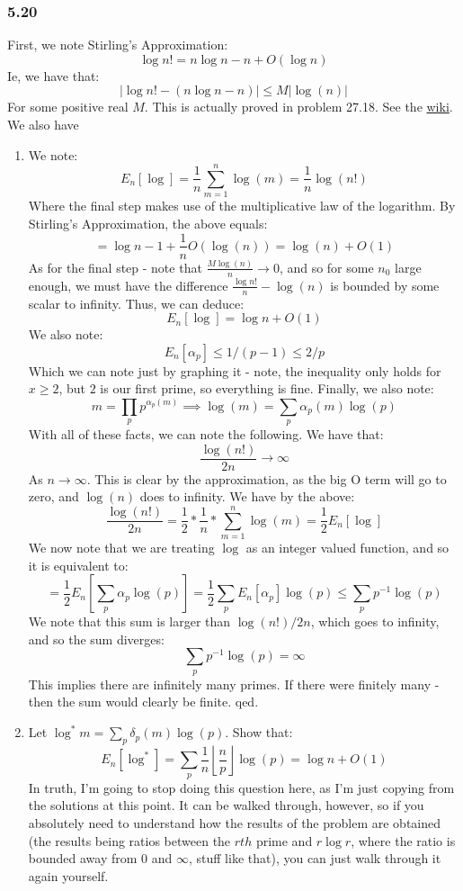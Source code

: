 \documentclass[12pt,a4paper]{article}
\newcommand{\1}[1]{\mathbbm{1}\left\{ #1 \right\}}
\newcommand{\floor}[1]{\left\lfloor #1 \right\rfloor}
\begin{document}
\subsubsection{5.20} First, we note Stirling's Approximation:
$$
	\log n! = n \log n - n + O(\log n)
$$
Ie, we have that:
$$
	\left|\log n! - (n \log n - n)\right| \leq M \left|\log(n)\right|
$$
For some positive real $M$. This is actually proved in problem 27.18. See the \href{https://en.wikipedia.org/wiki/Stirling%27s_approximation}{wiki}. We also have

\begin{enumerate}
	\item We note:
	$$
		E_n[\log] = \frac{1}{n}\sum_{m=1}^n \log(m) = \frac{1}{n} \log(n!)
	$$
	Where the final step makes use of the multiplicative law of the logarithm. By Stirling's Approximation, the above equals:
	$$
		= \log n - 1 + \frac{1}{n} O(\log(n)) = \log(n) + O(1)
	$$
	As for the final step - note that $\frac{M\log(n)}{n} \to 0$, and so for some $n_0$ large enough, we must have the difference $\frac{\log n!}{n} - \log(n)$ is bounded by some scalar to infinity. Thus, we can deduce:
	$$
		E_n[\log] = \log n + O(1)
	$$
	We also note:
	$$
		E_n[\alpha_p] \leq 1/(p-1) \leq 2/p
	$$
	Which we can note just by graphing it - note, the inequality only holds for $x \geq 2$, but $2$ is our first prime, so everything is fine. Finally, we also note:
	$$
		m = \prod_p p^{\alpha_p(m)} \implies \log(m) = \sum_p \alpha_p(m) \log(p)
	$$
	With all of these facts, we can note the following. We have that:
	$$
		\frac{\log(n!)}{2n} \to \infty
	$$
	As $n \to \infty$. This is clear by the approximation, as the big O term will go to zero, and $\log(n)$ does to infinity. We have by the above:
	$$
		\frac{\log(n!)}{2n} = \frac{1}{2} * \frac{1}{n} * \sum_{m=1}^n \log(m) = \frac{1}{2} E_n[\log]
	$$
	We now note that we are treating $\log$ as an integer valued function, and so it is equivalent to:
	$$
		= \frac{1}{2} E_n\left[\sum_p \alpha_p \log(p)\right] =
		\frac{1}{2} \sum_p E_n[\alpha_p] \log(p) \leq
		\sum_p p^{-1} \log(p)
	$$
	We note that this sum is larger than $\log(n!)/2n$, which goes to infinity, and so the sum diverges:
	$$
		\sum_p p^{-1} \log(p) = \infty
	$$
	This implies there are infinitely many primes. If there were finitely many - then the sum would clearly be finite. qed.
	
	\item Let $\log^* m = \sum_p \delta_p(m) \log(p)$. Show that:
	$$
		E_n[\log^*] = \sum_p \frac{1}{n}\floor{\frac{n}{p}} \log(p) = \log n + O(1)
	$$
	In truth, I'm going to stop doing this question here, as I'm just copying from the solutions at this point. It can be walked through, however, so if you absolutely need to understand how the results of the problem are obtained (the results being ratios between the $rth$ prime and $r \log r$, where the ratio is bounded away from $0$ and $\infty$, stuff like that), you can just walk through it again yourself.
\end{enumerate}
\end{document}
